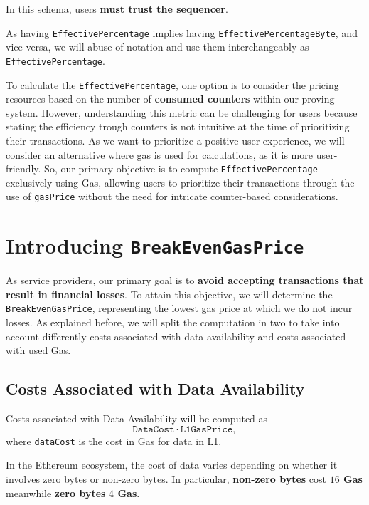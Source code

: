 In this schema, users \textbf{must trust the sequencer}. 

As having \texttt{EffectivePercentage} implies having \texttt{EffectivePercentageByte}, and vice versa, we will abuse of notation and use them interchangeably as \texttt{EffectivePercentage}.

To calculate the \texttt{EffectivePercentage}, one option is to consider the pricing resources based on the number of \textbf{consumed counters} within our proving system. However, understanding this metric can be challenging for users because stating the efficiency trough counters is not intuitive at the time of prioritizing their transactions. As we want to prioritize a positive user experience, we will consider an alternative where gas is used for calculations, as it is more user-friendly. So, our primary objective is to compute \texttt{EffectivePercentage} exclusively using Gas, allowing users to prioritize their transactions through the use of \texttt{gasPrice} without the need for intricate counter-based considerations.




\section{Introducing \texttt{BreakEvenGasPrice}}

As service providers, our primary goal is to \textbf{avoid accepting transactions that result in financial losses}. To attain this objective, we will determine the \texttt{BreakEvenGasPrice}, representing the lowest gas price at which we do not incur losses. As explained before, we will split the computation in two to take into account differently costs associated with data availability and costs associated with used Gas.


\subsection{Costs Associated with Data Availability}

Costs associated with Data Availability will be computed as
\[
\texttt{DataCost} \cdot \texttt{L1GasPrice},
\]
where \texttt{dataCost} is the cost in Gas for data in L1.

In the Ethereum ecosystem, the cost of data varies depending on whether it involves zero bytes or non-zero bytes. In particular, \textbf{non-zero bytes} cost \textbf{$16$ Gas} meanwhile \textbf{zero bytes} \textbf{$4$ Gas}.

